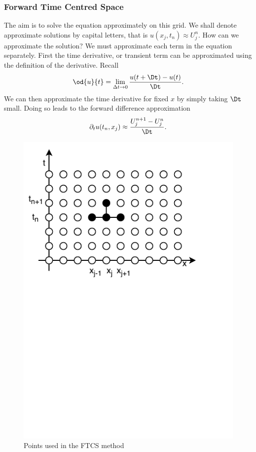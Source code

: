 \subsubsection*{Forward Time Centred Space}
The aim is to solve the equation approximately on this grid. We shall denote approximate solutions by capital letters, that is \(u(x_j,t_n) \approx U_j^n\). How can we approximate the solution? We must approximate each term in the equation separately. First the time derivative, or transient term can be approximated using the definition of the derivative. Recall
\[
\od{u}{t} = \lim_{\Delta t \to 0}\frac{u(t+\Dt) - u(t)}{\Dt}.
\]
We can then approximate the time derivative for fixed $x$ by simply taking \(\Dt\) small. Doing so leads to the forward difference approximation
\[
\partial_t u(t_n,x_j) \approx \frac{U^{n+1}_j- U^n_j}{\Dt}.
\]
\begin{figure}
    \centering
    \includegraphics[width=0.5\linewidth, trim={0 5cm 0 0}]{Figures/FTCS}
    \caption[FTCS stencil]{Points used in the FTCS method}
    \label{fig:FTCSmesh}
\end{figure}


